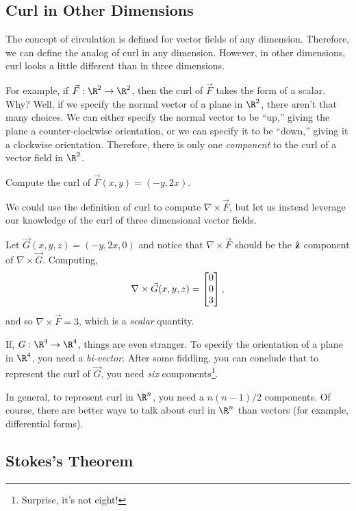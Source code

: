 \subsection{Curl in Other Dimensions}

The concept of circulation is defined for vector fields of any dimension.
Therefore, we can define the analog of curl in any dimension.  However,
in other dimensions, curl looks a little different than in three dimensions.

For example, if $\vec F:\R^2\to\R^2$, then the curl of $\vec F$ takes the form
of a scalar.  Why?  Well, if we specify the normal vector of a plane in
$\R^2$, there aren't that many choices.  We can either specify the normal 
vector to be ``up,'' giving the plane a counter-clockwise orientation, or
we can specify it to be ``down,'' giving it a clockwise orientation.  Therefore,
there is only one \emph{component} to the curl of a vector field in $\R^2$.

\begin{example}
	Compute the curl of $\vec F(x,y) = (-y,2x)$.

	We could use the definition of curl to compute $\nabla \times \vec F$, but let
	us instead leverage our knowledge of the curl of three dimensional vector fields.

	Let $\vec G(x,y,z) = (-y, 2x, 0)$ and notice that $\nabla \times \vec F$ should be the
	${\hat {\mathbf z}}$ component of $\nabla \times \vec G$.  Computing,
	\[
		\nabla \times \vec G(x,y,z) = \mat{0\\0\\3},
	\]
	and so $\nabla \times \vec F=3$, which is a \emph{scalar} quantity.
\end{example}

If, $G:\R^4\to\R^4$, things are even stranger.  To specify the orientation
of a plane in $\R^4$, you need a \emph{bi-vector}.  After 
some fiddling, you can conclude that to represent the curl of $\vec G$, you
need \emph{six} components\footnote{ Surprise, it's not eight!}.

In general, to represent curl in $\R^n$, you need a $n(n-1)/2$ components.
Of course, there are better ways to talk about curl in $\R^n$ than vectors
(for example, differential forms).

\subsection{Stokes's Theorem}

